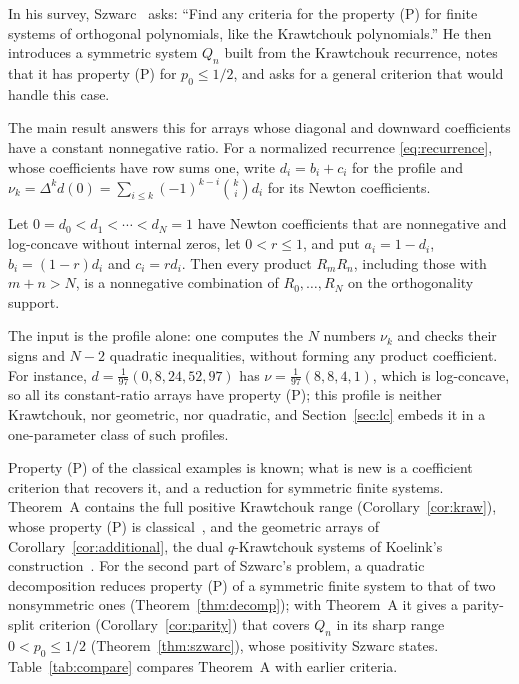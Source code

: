 In his survey, Szwarc~\cite[\S5, Problem~2]{szwarc} asks: ``Find any criteria for the property (P) for finite systems of orthogonal polynomials, like the Krawtchouk polynomials.'' He then introduces a symmetric system $Q_n$ built from the Krawtchouk recurrence, notes that it has property (P) for $p_0\leq1/2$, and asks for a general criterion that would handle this case.

The main result answers this for arrays whose diagonal and downward coefficients have a constant nonnegative ratio. For a normalized recurrence \eqref{eq:recurrence}, whose coefficients have row sums one, write $d_i=b_i+c_i$ for the profile and $\nu_k=\Delta^kd(0)=\sum_{i\leq k}(-1)^{k-i}\binom kid_i$ for its Newton coefficients.

\begin{mainthm}
Let $0=d_0<d_1<\cdots<d_N=1$ have Newton coefficients that are nonnegative and log-concave without internal zeros, let $0<r\leq1$, and put $a_i=1-d_i$, $b_i=(1-r)d_i$ and $c_i=rd_i$. Then every product $R_mR_n$, including those with $m+n>N$, is a nonnegative combination of $R_0,\ldots,R_N$ on the orthogonality support.
\end{mainthm}

The input is the profile alone: one computes the $N$ numbers $\nu_k$ and checks their signs and $N-2$ quadratic inequalities, without forming any product coefficient. For instance, $d=\frac1{97}(0,8,24,52,97)$ has $\nu=\frac1{97}(8,8,4,1)$, which is log-concave, so all its constant-ratio arrays have property (P); this profile is neither Krawtchouk, nor geometric, nor quadratic, and Section~\ref{sec:lc} embeds it in a one-parameter class of such profiles.

Property (P) of the classical examples is known; what is new is a coefficient criterion that recovers it, and a reduction for symmetric finite systems. Theorem~A contains the full positive Krawtchouk range (Corollary~\ref{cor:kraw}), whose property (P) is classical~\cite{eagleson,dunkl,szwarc}, and the geometric arrays of Corollary~\ref{cor:additional}, the dual $q$-Krawtchouk systems of Koelink's construction~\cite{koelink}. For the second part of Szwarc's problem, a quadratic decomposition reduces property (P) of a symmetric finite system to that of two nonsymmetric ones (Theorem~\ref{thm:decomp}); with Theorem~A it gives a parity-split criterion (Corollary~\ref{cor:parity}) that covers $Q_n$ in its sharp range $0<p_0\leq1/2$ (Theorem~\ref{thm:szwarc}), whose positivity Szwarc states. Table~\ref{tab:compare} compares Theorem~A with earlier criteria.

